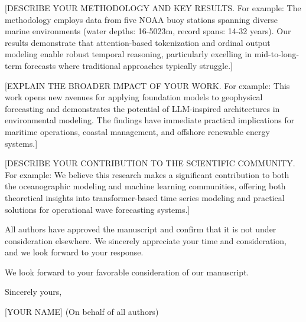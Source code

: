 \documentclass{article}
\begin{document}
\bigskip

[DESCRIBE YOUR METHODOLOGY AND KEY RESULTS. For example: The methodology employs data from five NOAA buoy stations spanning diverse marine environments (water depths: 16-5023m, record spans: 14-32 years). Our results demonstrate that attention-based tokenization and ordinal output modeling enable robust temporal reasoning, particularly excelling in mid-to-long-term forecasts where traditional approaches typically struggle.]

[EXPLAIN THE BROADER IMPACT OF YOUR WORK. For example: This work opens new avenues for applying foundation models to geophysical forecasting and demonstrates the potential of LLM-inspired architectures in environmental modeling. The findings have immediate practical implications for maritime operations, coastal management, and offshore renewable energy systems.]

[DESCRIBE YOUR CONTRIBUTION TO THE SCIENTIFIC COMMUNITY. For example: We believe this research makes a significant contribution to both the oceanographic modeling and machine learning communities, offering both theoretical insights into transformer-based time series modeling and practical solutions for operational wave forecasting systems.]


All authors have approved the manuscript and confirm that it is not under consideration elsewhere. We sincerely appreciate your time and consideration, and we look forward to your response.

We look forward to your favorable consideration of our manuscript.


\bigskip %

Sincerely yours,

\vspace{20pt} %

[YOUR NAME]
(On behalf of all authors)
\end{document}
